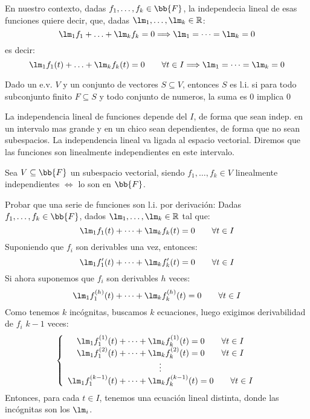 En nuestro contexto, dadas $f_1,\ldots,f_k\in \bb{F}$, la independecia lineal de esas funciones quiere decir, que, dadas $\lm_1,\ldots,\lm_k\in \mathbb{R}$:
\begin{equation*}
    \lm_1f_1 + \ldots + \lm_k f_k = 0 \Longrightarrow \lm_1 = \cdots = \lm_k = 0
\end{equation*}
es decir:
\begin{equation*}
    \lm_1f_1(t) + \ldots + \lm_k f_k(t) = 0 \qquad \forall t\in I \Longrightarrow \lm_1 = \cdots = \lm_k = 0
\end{equation*}

Dado un e.v. $V$ y un conjunto de vectores $S\subseteq V$, entonces $S$ es l.i. si para todo subconjunto finito $F\subseteq S$ y todo conjunto de numeros, la suma es 0 implica 0


La independencia lineal de funciones depende del $I$, de forma que sean indep. en un intervalo mas grande y en un chico sean dependientes, de forma que no sean subespacios.
La independencia lineal va ligada al espacio vectorial.
Diremos que las funciones son linealmente independientes en este intervalo.


\begin{prop}
    Sea $V\subseteq \bb{F}$ un subespacio vectorial, siendo $f_1,\ldots,f_k\in V$ linealmente independientes $\Longleftrightarrow $ lo son en $\bb{F}$.
\end{prop}


Probar que una serie de funciones son l.i. por derivación:
Dadas $f_1,\ldots,f_k \in \bb{F}$, dados $\lm_1,\ldots,\lm_k\in \mathbb{R}$ tal que:
\begin{equation*}
    \lm_1 f_1(t) + \cdots + \lm_k f_k(t) = 0 \qquad \forall t\in I
\end{equation*}
Suponiendo que $f_i$ son derivables una vez, entonces:
\begin{equation*}
    \lm_1 f_1'(t) + \cdots + \lm_k f_k'(t) = 0 \qquad \forall t\in I
\end{equation*}
Si ahora suponemos que $f_i$ son derivables $h$ veces:
\begin{equation*}
    \lm_1 f_1^{(h)}(t) + \cdots + \lm_k f_k^{(h)}(t) = 0 \qquad \forall t\in I
\end{equation*}
Como tenemos $k$ incógnitas, buscamos $k$ ecuaciones, luego exigimos derivabilidad de $f_i$ $k-1$ veces:
\begin{equation*}
    \left\{\begin{array}{c}
    \lm_1 f_1^{(1)}(t) + \cdots + \lm_k f_k^{(1)}(t) = 0 \qquad \forall t\in I \\
    \lm_1 f_1^{(2)}(t) + \cdots + \lm_k f_k^{(2)}(t) = 0 \qquad \forall t\in I \\
    \vdots \\
    \lm_1 f_1^{(k-1)}(t) + \cdots + \lm_k f_k^{(k-1)}(t) = 0 \qquad \forall t\in I
    \end{array}\right.
\end{equation*}
Entonces, para cada $t\in I$, tenemos una ecuación lineal distinta, donde las incógnitas son los $\lm_i$.

